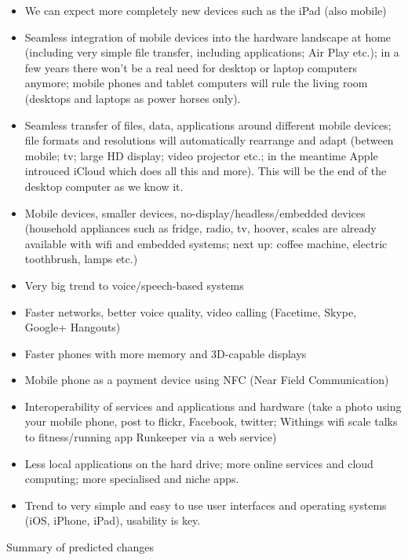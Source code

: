 \documentclass[10pt, plain]{../../metanetpaper}
\begin{document}
\begin{multicols}{2}
\begin{itemize}
\item We can expect more completely new devices such as the iPad (also mobile)
\item Seamless integration of mobile devices into the hardware landscape at home (including very simple file transfer, including applications; Air Play etc.); in a few years there won’t be a real need for desktop or laptop computers anymore; mobile phones and tablet computers will rule the living room (desktops and laptops as power horses only).
\item Seamless transfer of files, data, applications around different mobile devices; file formats and resolutions will automatically rearrange and adapt (between mobile; tv; large HD display; video projector etc.; in the meantime Apple introuced iCloud which does all this and more). This will be the end of the desktop computer as we know it.
\item Mobile devices, smaller devices, no-display/headless/embedded devices (household appliances such as fridge, radio, tv, hoover, scales are already available with wifi and embedded systems; next up: coffee machine, electric toothbrush, lamps etc.)
\item Very big trend to voice/speech-based systems
\item Faster networks, better voice quality, video calling (Facetime, Skype, Google+ Hangouts)
\item Faster phones with more memory and 3D-capable displays
\item Mobile phone as a payment device using NFC (Near Field Communication)
\item Interoperability of services and applications and hardware (take a photo using your mobile phone, post to flickr, Facebook, twitter; Withings wifi scale talks to fitness/running app Runkeeper via a web service)
\item Less local applications on the hard drive; more online services and cloud computing; more specialised and niche apps.
\item Trend to very simple and easy to use user interfaces and operating systems (iOS, iPhone, iPad), usability is key.
\end{itemize}

Summary of predicted changes


\end{multicols}
\end{document}
